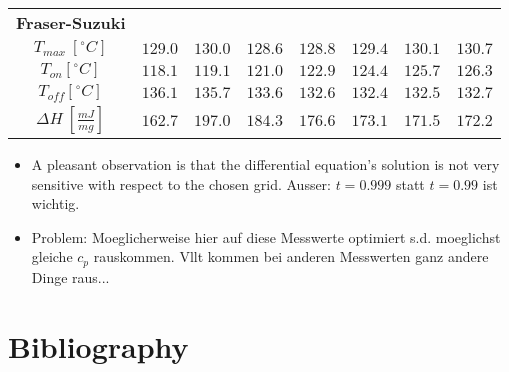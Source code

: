 \documentclass{scrartcl}[12pt, halfparskip]
\numberwithin{equation}{section}
\numberwithin{figure}{section}
\numberwithin{table}{section}
\begin{document}
\begin{table}[H]
\begin{tabular}{| c | c | c | c | c | c | c | c |}
		
		\textbf{Fraser-Suzuki} & & & & & & & \\[0.7ex]
		$T_{max} \ [^{\circ}C]$ & $129.0$ & $130.0$ & $128.6$ & $128.8$ & $129.4$ & $130.1$ & $130.7$ \\[0.7ex]
		$T_{on} [^{\circ} C]$ & $118.1$ & $119.1$ & $121.0$ & $122.9$ & $124.4$ & $125.7$ & $126.3$ \\[0.7ex]
		$T_{off} [^{\circ} C]$ & $136.1$ & $135.7$ & $133.6$ & $132.6$ & $132.4$ & $132.5$ & $132.7$ \\[0.7ex]
		$\Delta H \ [\frac{mJ}{mg}]$ & $162.7$ & $197.0$ & $184.3$ & $176.6$ & $173.1$ & $171.5$ & $172.2$ \\ \hline
	\end{tabular}
	\caption{}
	\label{fig:eval_table_discussion}
\end{table}



\begin{itemize}
	\item A pleasant observation is that the differential equation's solution is not very sensitive with respect to the chosen grid.  Ausser: $t=0.999$ statt $t=0.99$ ist wichtig.
	\item Problem: Moeglicherweise hier auf diese Messwerte optimiert s.d. moeglichst gleiche $c_p$ rauskommen. Vllt kommen bei anderen Messwerten ganz andere Dinge raus...
\end{itemize}


\section{Bibliography}
\end{document}
